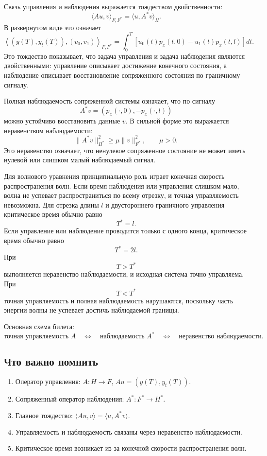 \documentclass[12pt,a4paper]{article}
\begin{document}
Связь управления и наблюдения выражается тождеством двойственности:
\[
 \langle Au,v\rangle_{F,F^*}=\langle u,A^*v\rangle_H.
\]
В развернутом виде это означает
\[
 \left\langle (y(T),y_t(T)),(v_0,v_1)\right\rangle_{F,F^*}
 =
 \int_0^T\left[u_0(t)p_x(t,0)-u_1(t)p_x(t,l)\right]dt.
\]
Это тождество показывает, что задача управления и задача наблюдения являются двойственными: управление описывает достижение конечного состояния, а наблюдение описывает восстановление сопряженного состояния по граничному сигналу.

Полная наблюдаемость сопряженной системы означает, что по сигналу
\[
 A^*v=(p_x(\cdot,0),-p_x(\cdot,l))
\]
можно устойчиво восстановить данные $v$. В сильной форме это выражается неравенством наблюдаемости:
\[
 \|A^*v\|_{H^*}^2\ge \mu \|v\|_{F^*}^2,
 \qquad \mu>0.
\]
Это неравенство означает, что ненулевое сопряженное состояние не может иметь нулевой или слишком малый наблюдаемый сигнал.

Для волнового уравнения принципиальную роль играет конечная скорость распространения волн. Если время наблюдения или управления слишком мало, волна не успевает распространиться по всему отрезку, и точная управляемость невозможна. Для отрезка длины $l$ и двустороннего граничного управления критическое время обычно равно
\[
 T^*=l.
\]
Если управление или наблюдение проводится только с одного конца, критическое время обычно равно
\[
 T^*=2l.
\]
При
\[
 T>T^*
\]
выполняется неравенство наблюдаемости, и исходная система точно управляема. При
\[
 T<T^*
\]
точная управляемость и полная наблюдаемость нарушаются, поскольку часть энергии волны не успевает достичь наблюдаемой границы.

Основная схема билета:
\[
 \text{точная управляемость } A
 \quad\Longleftrightarrow\quad
 \text{наблюдаемость } A^*
 \quad\Longleftrightarrow\quad
 \text{неравенство наблюдаемости}.
\]

\subsection*{Что важно помнить}
\begin{enumerate}
\item Оператор управления: $A:H\to F$, $Au=(y(T),y_t(T))$.
\item Сопряженный оператор наблюдения: $A^*:F^*\to H^*$.
\item Главное тождество: $\langle Au,v\rangle=\langle u,A^*v\rangle$.
\item Управляемость и наблюдаемость связаны через неравенство наблюдаемости.
\item Критическое время возникает из-за конечной скорости распространения волн.
\end{enumerate}
\end{document}
